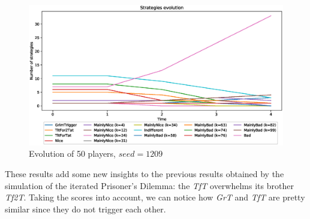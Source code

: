 \documentclass[journal,10pt,twoside]{IEEEtran}
\begin{document}
\begin{figure}[!ht]
    \centering
    \includegraphics[width=1\columnwidth]{../img/ripdmp-const/seed1209/ripdmp-evolution-const-pop-50}
    \caption{Evolution of 50 players, $seed = 1209$}
    \label{fig:constRseed1209}
\end{figure}

These results add some new insights to the previous results obtained by the simulation of the iterated Prisoner's Dilemma: the \textit{TfT} overwhelms its brother \textit{Tf2T}. Taking the scores into account, we can notice how \textit{GrT} and \textit{TfT} are pretty similar since they do not trigger each other.
\end{document}
